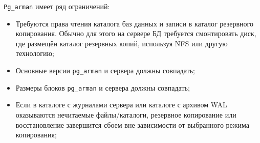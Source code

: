 \lstinline!Pg_arman! имеет ряд ограничений:

\begin{itemize}
  \item Требуются права чтения каталога баз данных и записи в каталог резервного копирования. Обычно для этого на сервере БД требуется смонтировать диск, где размещён каталог резервных копий, используя NFS или другую технологию;
  \item Основные версии \lstinline!pg_arman! и сервера должны совпадать;
  \item Размеры блоков \lstinline!pg_arman! и сервера должны совпадать;
  \item Если в каталоге с журналами сервера или каталоге с архивом WAL оказываются нечитаемые файлы/каталоги, резервное копирование или восстановление завершится сбоем вне зависимости от выбранного режима копирования;
\end{itemize}
